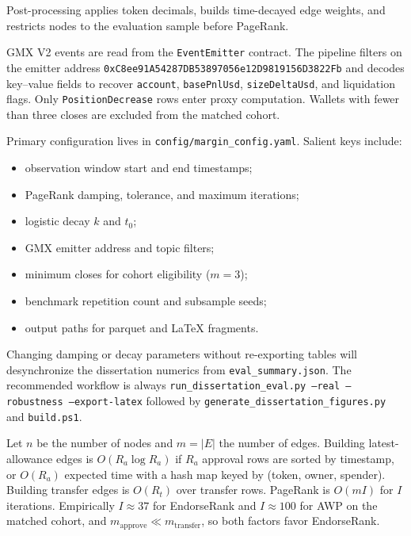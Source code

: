 Post-processing applies token decimals, builds time-decayed edge weights, and restricts nodes to the evaluation sample before PageRank.


GMX V2 events are read from the \texttt{EventEmitter} contract. The pipeline filters on the emitter address
\texttt{0xC8ee91A54287DB53897056e12D9819156D3822Fb}
and decodes key--value fields to recover \texttt{account}, \texttt{basePnlUsd}, \texttt{sizeDeltaUsd}, and liquidation flags. Only \texttt{PositionDecrease} rows enter proxy computation. Wallets with fewer than three closes are excluded from the matched cohort.


Primary configuration lives in \texttt{config/margin\_config.yaml}. Salient keys include:

\begin{itemize}
\item observation window start and end timestamps;
\item PageRank damping, tolerance, and maximum iterations;
\item logistic decay $k$ and $t_0$;
\item GMX emitter address and topic filters;
\item minimum closes for cohort eligibility ($m=3$);
\item benchmark repetition count and subsample seeds;
\item output paths for parquet and LaTeX fragments.
\end{itemize}

Changing damping or decay parameters without re-exporting tables will desynchronize the dissertation numerics from \texttt{eval\_summary.json}. The recommended workflow is always \texttt{run\_dissertation\_eval.py --real --robustness --export-latex} followed by \texttt{generate\_dissertation\_figures.py} and \texttt{build.ps1}.


Let $n$ be the number of nodes and $m=|E|$ the number of edges. Building latest-allowance edges is $O(R_a\log R_a)$ if $R_a$ approval rows are sorted by timestamp, or $O(R_a)$ expected time with a hash map keyed by (token, owner, spender). Building transfer edges is $O(R_t)$ over transfer rows. PageRank is $O(mI)$ for $I$ iterations. Empirically $I\approx 37$ for EndorseRank and $I\approx 100$ for AWP on the matched cohort, and $m_{\mathrm{approve}}\ll m_{\mathrm{transfer}}$, so both factors favor EndorseRank.

